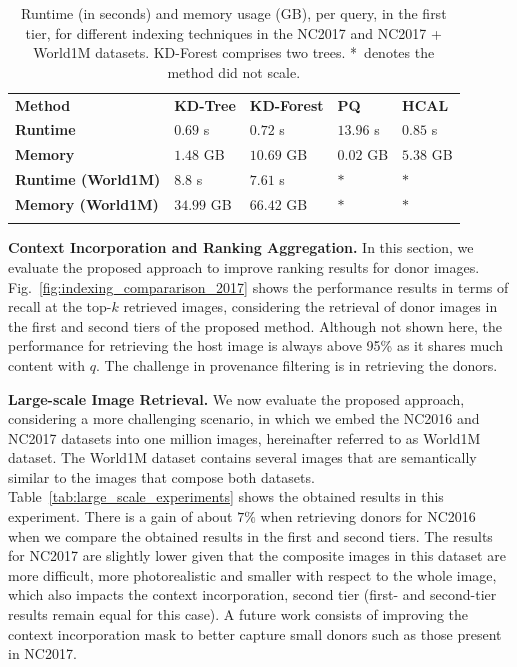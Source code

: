 \begin{table}[t]
	\begin{center}
	\begin{footnotesize}	
	\setlength{\tabcolsep}{0.5em}
	\renewcommand{\arraystretch}{0.7}
	\caption{Runtime (in seconds) and memory usage (GB), per query, in the first tier, for different indexing techniques in the NC2017 and NC2017 + World1M datasets. KD-Forest comprises two trees. *~denotes the method did not scale.}
	\label{tab:indexing_method}
	\begin{tabular}{p{2.5cm}p{1.2cm}p{1.5cm}p{1.1cm}p{}}
		\topline
		\headcol \textbf{Method} & \textbf{KD-Tree} & \textbf{KD-Forest} & \textbf{PQ} & \textbf{HCAL} \\
		\midline
		\textbf{Runtime} & $0.69$ s& $0.72$ s& $13.96$ s& $0.85$ s\\
		\rowcol \textbf{Memory} & $1.48$ GB & $10.69$ GB & $0.02$ GB & $5.38$ GB \\
\hline
		\textbf{Runtime (World1M)} & $8.8$ s& $7.61$ s& $*$ & $*$ \\
		\rowcol \textbf{Memory (World1M)} & $34.99$ GB & $66.42$ GB & $*$  & $*$  \\
		\bottomlinec
	\end{tabular}
	\end{footnotesize}	
	\end{center}	
\end{table}

\vspace*{0.1cm}
\noindent
\textbf{Context Incorporation and Ranking Aggregation.} In this section, we evaluate the proposed approach to improve ranking results for donor images. 
Fig.~\ref{fig:indexing_compararison_2017} shows the performance results in terms of recall at the top-$k$ retrieved images, considering the retrieval of donor images in the first and second tiers of the proposed method. Although not shown here, the performance for retrieving the host image is always above 95\% as it shares much content with $q$. The challenge in provenance filtering is in retrieving the donors.

\vspace*{0.1cm}
\noindent
\textbf{Large-scale Image Retrieval.} We now evaluate the proposed approach, considering a more challenging scenario, in which we embed the NC2016 and NC2017 datasets into one million images, hereinafter referred to as World1M dataset. The World1M dataset contains several images that are semantically similar to the images that compose both datasets. Table~\ref{tab:large_scale_experiments} shows the obtained results in this experiment. There is a gain of about $7\%$ when retrieving donors for  NC2016 when we compare the obtained results in the first and second tiers. The results for NC2017 are slightly lower given that the composite images in this dataset are more difficult, more photorealistic and smaller with respect to the whole image, which also impacts the context incorporation, second tier (first- and second-tier results remain equal for this case). A future work consists of improving the context incorporation mask to better capture small donors such as those present in NC2017. 


